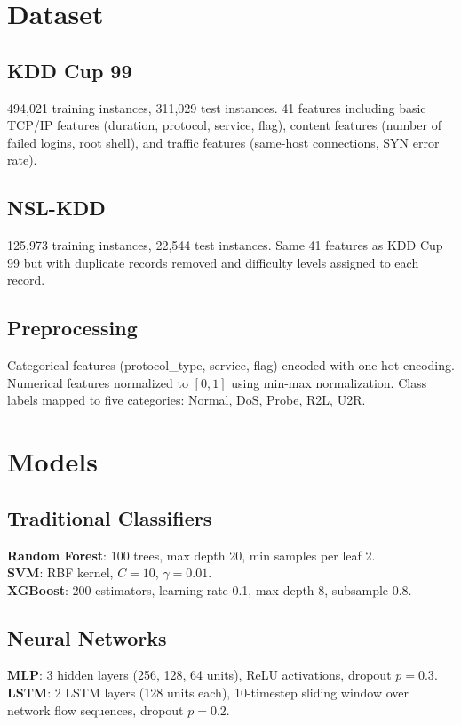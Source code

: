 \documentclass[conference]{IEEEtran}
\begin{document}
\section{Dataset}

\subsection{KDD Cup 99}
494,021 training instances, 311,029 test instances. 41 features including basic TCP/IP features (duration, protocol, service, flag), content features (number of failed logins, root shell), and traffic features (same-host connections, SYN error rate).

\subsection{NSL-KDD}
125,973 training instances, 22,544 test instances. Same 41 features as KDD Cup 99 but with duplicate records removed and difficulty levels assigned to each record.

\subsection{Preprocessing}
Categorical features (protocol\_type, service, flag) encoded with one-hot encoding. Numerical features normalized to $[0, 1]$ using min-max normalization. Class labels mapped to five categories: Normal, DoS, Probe, R2L, U2R.

\section{Models}

\subsection{Traditional Classifiers}
\textbf{Random Forest}: 100 trees, max depth 20, min samples per leaf 2.\\
\textbf{SVM}: RBF kernel, $C=10$, $\gamma=0.01$.\\
\textbf{XGBoost}: 200 estimators, learning rate 0.1, max depth 8, subsample 0.8.

\subsection{Neural Networks}
\textbf{MLP}: 3 hidden layers (256, 128, 64 units), ReLU activations, dropout $p=0.3$.\\
\textbf{LSTM}: 2 LSTM layers (128 units each), 10-timestep sliding window over network flow sequences, dropout $p=0.2$.
\end{document}
